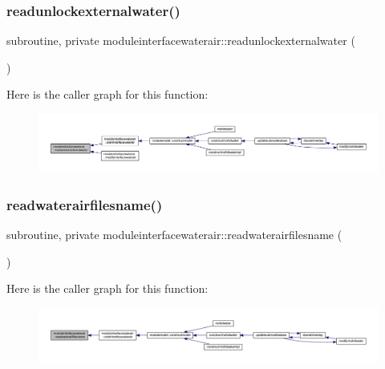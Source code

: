 \subsubsection{\texorpdfstring{readunlockexternalwater()}{readunlockexternalwater()}}
{\footnotesize\ttfamily subroutine, private moduleinterfacewaterair\+::readunlockexternalwater (\begin{DoxyParamCaption}{ }\end{DoxyParamCaption})\hspace{0.3cm}{\ttfamily [private]}}

Here is the caller graph for this function\+:\nopagebreak
\begin{figure}[H]
\begin{center}
\leavevmode
\includegraphics[width=350pt]{namespacemoduleinterfacewaterair_a380a0dfa2a33b7c2eef433d69fdf7fef_icgraph}
\end{center}
\end{figure}
\mbox{\label{namespacemoduleinterfacewaterair_a8a015dc245f72a1e32671973e4ef4538}} 
\subsubsection{\texorpdfstring{readwaterairfilesname()}{readwaterairfilesname()}}
{\footnotesize\ttfamily subroutine, private moduleinterfacewaterair\+::readwaterairfilesname (\begin{DoxyParamCaption}{ }\end{DoxyParamCaption})\hspace{0.3cm}{\ttfamily [private]}}

Here is the caller graph for this function\+:\nopagebreak
\begin{figure}[H]
\begin{center}
\leavevmode
\includegraphics[width=350pt]{namespacemoduleinterfacewaterair_a8a015dc245f72a1e32671973e4ef4538_icgraph}
\end{center}
\end{figure}
\mbox{\label{namespacemoduleinterfacewaterair_a519b1351dce06ffef1eb101335e6361f}} 
